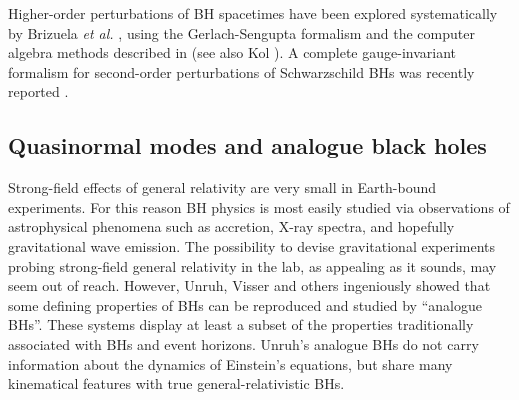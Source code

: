 \documentclass[]{iopart}
\begin{document}
Higher-order perturbations of BH spacetimes have been explored systematically
by Brizuela {\it et al.} \cite{Brizuela:2006ne,Brizuela:2007zza}, using the
Gerlach-Sengupta formalism and the computer algebra methods described in
\cite{Brizuela:2008ra} (see also Kol \cite{Kol:2007mw}). A complete gauge-invariant formalism for second-order perturbations of
Schwarzschild BHs was recently reported \cite{Brizuela:2009qd}.

\subsection{\label{ref:acoustic}Quasinormal modes and analogue black holes}

Strong-field effects of general relativity are very small in Earth-bound
experiments. For this reason BH physics is most easily studied via
observations of astrophysical phenomena such as accretion, X-ray spectra, and
hopefully gravitational wave emission. The possibility to devise gravitational
experiments probing strong-field general relativity in the lab, as appealing
as it sounds, may seem out of reach. However, Unruh, Visser and others
\cite{Unruh:1980cg,Barcelo:2005fc} ingeniously showed that some defining
properties of BHs can be reproduced and studied by ``analogue BHs''. These
systems display at least a subset of the properties traditionally associated
with BHs and event horizons. Unruh's analogue BHs do not carry information
about the dynamics of Einstein's equations, but share many kinematical
features with true general-relativistic BHs.
\end{document}

